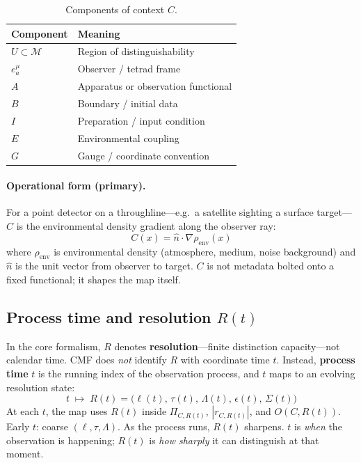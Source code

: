 \documentclass[11pt,a4paper]{article}
\newcommand{\M}{\mathcal{M}}
\begin{document}
\begin{table}[h]
  \centering
  \caption{Components of context $C$.}
  \label{tab:context}
  \begin{tabular}{@{}ll@{}}
    \toprule
    Component & Meaning \\
    \midrule
    $U \subset \M$ & Region of distinguishability \\
    $e^\mu_a$ & Observer / tetrad frame \\
    $A$ & Apparatus or observation functional \\
    $B$ & Boundary / initial data \\
    $I$ & Preparation / input condition \\
    $E$ & Environmental coupling \\
    $G$ & Gauge / coordinate convention \\
    \bottomrule
  \end{tabular}
\end{table}

\paragraph{Operational form (primary).}
For a point detector on a throughline---e.g.\ a satellite sighting a surface target---$C$ is the environmental density gradient along the observer ray:
\begin{equation}
  C(x) = \hat{n} \cdot \nabla \rho_{\mathrm{env}}(x)
  \label{eq:context-gradient}
\end{equation}
where $\rho_{\mathrm{env}}$ is environmental density (atmosphere, medium, noise background) and $\hat{n}$ is the unit vector from observer to target. $C$ is not metadata bolted onto a fixed functional; it shapes the map itself.

\subsection{Process time and resolution \texorpdfstring{$R(t)$}{R(t)}}

In the core formalism, $R$ denotes \textbf{resolution}---finite distinction capacity---not calendar time. CMF does \emph{not} identify $R$ with coordinate time $t$. Instead, \textbf{process time} $t$ is the running index of the observation process, and $t$ maps to an evolving resolution state:
\begin{equation}
  t \;\longmapsto\; R(t) = \bigl(\ell(t),\, \tau(t),\, \Lambda(t),\, \epsilon(t),\, \Sigma(t)\bigr)
  \label{eq:R-of-t}
\end{equation}
At each $t$, the map uses $R(t)$ inside $\Pi_{C,R(t)}$, $|r_{C,R(t)}|$, and $O(C,R(t))$. Early $t$: coarse $(\ell,\tau,\Lambda)$. As the process runs, $R(t)$ sharpens. $t$ is \emph{when} the observation is happening; $R(t)$ is \emph{how sharply} it can distinguish at that moment.
\end{document}
